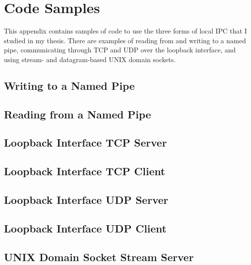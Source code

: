 \chapter{Code Samples}
\label{sec:codeSamples}
This appendix contains samples of code to use the three forms of local IPC that I studied in my thesis.  There are examples of reading from and writing to a named pipe, communicating through TCP and UDP over the loopback interface, and using stream- and datagram-based UNIX domain sockets.

\section{Writing to a Named Pipe}
\label{appendix:namedPipeWrite}


\section{Reading from a Named Pipe}
\label{appendix:namedPipeRead}


\section{Loopback Interface TCP Server}
\label{appendix:loopbackTcpServer}


\section{Loopback Interface TCP Client}
\label{appendix:loopbackTcpClient}


\section{Loopback Interface UDP Server}
\label{appendix:loopbackUdpServer}


\section{Loopback Interface UDP Client}
\label{appendix:loopbackUdpClient}


\section{UNIX Domain Socket Stream Server}
\label{appendix:unixStreamServer}


